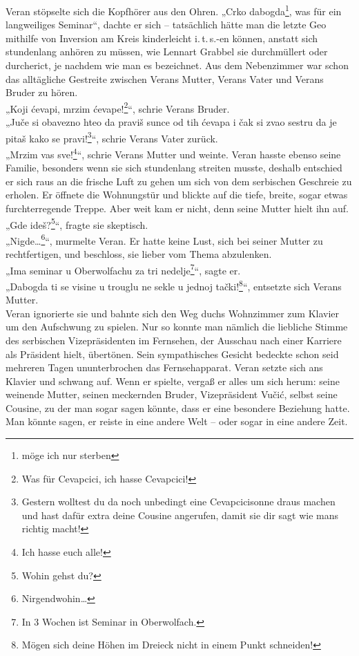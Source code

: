 \documentclass[oneside]{memoir}
\begin{document}
\noindent Veran stöpselte sich die Kopfhörer aus den Ohren. „Crko dabogda\footnote{möge ich nur sterben}, was für ein langweiliges Seminar“, dachte er sich -- tatsächlich hätte man die letzte Geo mithilfe von Inversion am Kreis kinderleicht i.\,t.\,s.-en können, anstatt sich stundenlang anhören zu müssen, wie Lennart Grabbel sie durchmüllert oder durcherict, je nachdem wie man es bezeichnet. Aus dem Nebenzimmer war schon das alltägliche Gestreite zwischen Verans Mutter, Verans Vater und Verans Bruder zu hören. \\
„Koji ćevapi, mrzim ćevape!\footnote{Was für Cevapcici, ich hasse Cevapcici!}“, schrie Verans Bruder. \\
„Juče si obavezno hteo da praviš sunce od tih ćevapa i čak si zvao sestru da je pitaš kako se pravi!\footnote{Gestern wolltest du da noch unbedingt eine Cevapcicisonne draus machen und hast dafür extra deine Cousine angerufen, damit sie dir sagt wie mans richtig macht!}“, schrie Verans Vater zurück. \\
„Mrzim vas sve!\footnote{Ich hasse euch alle!}“, schrie Verans Mutter und weinte. Veran hasste ebenso seine Familie, besonders wenn sie sich stundenlang streiten musste, deshalb entschied er sich raus an die frische Luft zu gehen um sich von dem serbischen Geschreie zu erholen. Er öffnete die Wohnungstür und blickte auf die tiefe, breite, sogar etwas furchterregende Treppe. Aber weit kam er nicht, denn seine Mutter hielt ihn auf. \\
„Gde ideš?\footnote{Wohin gehst du?}“, fragte sie skeptisch. \\
„Nigde\ldots\footnote{Nirgendwohin\ldots}“, murmelte Veran. Er hatte keine Lust, sich bei seiner Mutter zu rechtfertigen, und beschloss, sie lieber vom Thema abzulenken. \\
„Ima seminar u Oberwolfachu za tri nedelje\footnote{In 3 Wochen ist Seminar in Oberwolfach.}“, sagte er. \\
„Dabogda ti se visine u trouglu ne sekle u jednoj tački!\footnote{Mögen sich deine Höhen im Dreieck nicht in einem Punkt schneiden!}“, entsetzte sich Verans Mutter. \\
Veran ignorierte sie und bahnte sich den Weg duchs Wohnzimmer zum Klavier um den Aufschwung zu spielen. Nur so konnte man nämlich die liebliche Stimme des serbischen Vizepräsidenten im Fernsehen, der Ausschau nach einer Karriere als Präsident hielt, übertönen. Sein sympathisches Gesicht bedeckte schon seid mehreren Tagen ununterbrochen das Fernsehapparat. Veran setzte sich ans Klavier und schwang auf. Wenn er spielte, vergaß er alles um sich herum: seine weinende Mutter, seinen meckernden Bruder, Vizepräsident Vučić, selbst seine Cousine, zu der man sogar sagen könnte, dass er eine besondere Beziehung hatte. Man könnte sagen, er reiste in eine andere Welt -- oder sogar in eine andere Zeit.
\end{document}
